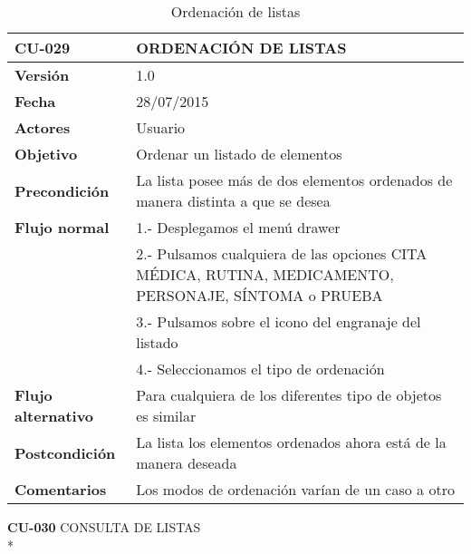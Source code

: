 \documentclass[../pfc.tex]{subfiles}
\begin{document}
	\begin{table}[H]
		\centering
		\begin{tabular}[t]{|p{3cm}|p{9.5cm}|}
			\hline \textbf{CU-029} & \textbf{ORDENACIÓN DE LISTAS} \\*
			\hline\hline \textbf{Versión} & 1.0 \\*
			\hline\hline \textbf{Fecha} & 28/07/2015 \\*
			\hline\textbf{Actores} 	& Usuario\\*
			\hline \textbf{Objetivo} & Ordenar un listado de elementos\\* 			
			\hline \textbf{Precondición} & La lista posee más de dos elementos ordenados de manera distinta a que se desea\\* 
			\hline \textbf{Flujo normal} & 1.- Desplegamos el menú drawer \\* 
			& 2.- Pulsamos cualquiera de las opciones CITA MÉDICA, RUTINA, MEDICAMENTO, PERSONAJE, SÍNTOMA o PRUEBA\\*	
			& 3.- Pulsamos sobre el icono del engranaje del listado\\*	
			& 4.- Seleccionamos el tipo de ordenación\\*	
			\hline \textbf{Flujo alternativo} & Para cualquiera de los diferentes tipo de objetos es similar \\* 
			\hline \textbf{Postcondición} & La lista los elementos ordenados ahora está de la manera deseada\\* 
			\hline \textbf{Comentarios}   & Los modos de ordenación varían de un caso a otro\\*
			\hline
		\end{tabular}
		\caption{Ordenación de listas}
		\label{tabla:caso029}
	\end{table}

	\clearpage

	\textbf{CU-030}	CONSULTA DE LISTAS\\* 
	
\end{document}
